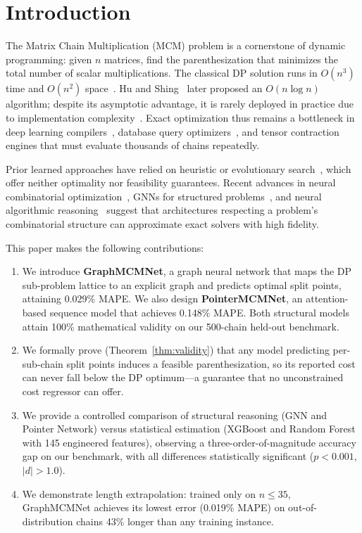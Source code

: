 \documentclass[conference]{IEEEtran}
\begin{document}
\section{Introduction}
The Matrix Chain Multiplication (MCM) problem is a cornerstone of dynamic
programming: given $n$ matrices, find the parenthesization that minimizes the
total number of scalar multiplications. The classical DP solution runs in $O(n^3)$
time and $O(n^2)$ space~\cite{b4}. Hu and Shing~\cite{b2} later proposed an
$O(n\log n)$ algorithm; despite its asymptotic advantage, it is rarely deployed
in practice due to implementation complexity~\cite{b3}. Exact optimization thus
remains a bottleneck in deep learning compilers~\cite{b23,b24}, database query
optimizers~\cite{b17,b19}, and tensor contraction engines that must evaluate
thousands of chains repeatedly.

Prior learned approaches have relied on heuristic or evolutionary
search~\cite{b5}, which offer neither optimality nor feasibility guarantees.
Recent advances in neural combinatorial optimization~\cite{b7,b8}, GNNs for
structured problems~\cite{b20,b21,b22}, and neural algorithmic
reasoning~\cite{b25,b26} suggest that architectures respecting a problem's
combinatorial structure can approximate exact solvers with high fidelity.

This paper makes the following contributions:
\begin{enumerate}
    \item We introduce \textbf{GraphMCMNet}, a graph neural network that maps
    the DP sub-problem lattice to an explicit graph and predicts optimal split
    points, attaining 0.029\% MAPE. We also design \textbf{PointerMCMNet}, an attention-based sequence model that achieves 0.148\% MAPE. Both structural models attain 100\% mathematical validity on our 500-chain held-out benchmark.
    \item We formally prove (Theorem~\ref{thm:validity}) that any model
    predicting per-sub-chain split points induces a feasible parenthesization,
    so its reported cost can never fall below the DP optimum---a guarantee that
    no unconstrained cost regressor can offer.
    \item We provide a controlled comparison of structural reasoning (GNN and
    Pointer Network) versus statistical estimation (XGBoost and Random Forest
    with 145 engineered features), observing a three-order-of-magnitude accuracy
    gap on our benchmark, with all differences statistically significant
    ($p{<}0.001$, $|d|{>}1.0$).
    \item We demonstrate length extrapolation: trained only on $n{\le}35$,
    GraphMCMNet achieves its lowest error (0.019\% MAPE) on out-of-distribution
    chains 43\% longer than any training instance.
\end{enumerate}
\end{document}
